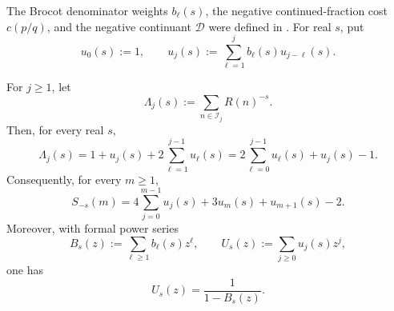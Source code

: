 \ifdefined\supplementonly
\else
The Brocot denominator weights \(b_\ell(s)\), the negative
continued-fraction cost \(c(p/q)\), and the negative continuant
\(\mathcal D\) were defined in .  For real
\(s\), put
\begin{equation}
 u_0(s):=1,\qquad
 u_j(s):=\sum_{\ell=1}^j b_\ell(s)u_{j-\ell}(s).
 \label{eq:weighted-renewal-coefficients}
\end{equation}

\begin{proposition}
\label{prop:weighted-generator-renewal}
For \(j\ge1\), let
\[
 \Lambda_j(s):=\sum_{n\in\mathcal I_j}R(n)^{-s}.
\]
Then, for every real \(s\),
\begin{equation}
 \Lambda_j(s)
 =1+u_j(s)+2\sum_{\ell=1}^{j-1}u_\ell(s)
 =2\sum_{\ell=0}^{j-1}u_\ell(s)+u_j(s)-1.
 \label{eq:weighted-layer-renewal}
\end{equation}
Consequently, for every \(m\ge1\),
\begin{equation}
 S_{-s}(m)
 =4\sum_{j=0}^{m-1}u_j(s)+3u_m(s)+u_{m+1}(s)-2.
 \label{eq:weighted-window-renewal}
\end{equation}
Moreover, with formal power series
\[
 B_s(z):=\sum_{\ell\ge1}b_\ell(s)z^\ell,
 \qquad U_s(z):=\sum_{j\ge0}u_j(s)z^j,
\]
one has
\begin{equation}
 U_s(z)=\frac1{1-B_s(z)}.
 \label{eq:weighted-renewal-generating-function}
\end{equation}
\end{proposition}

